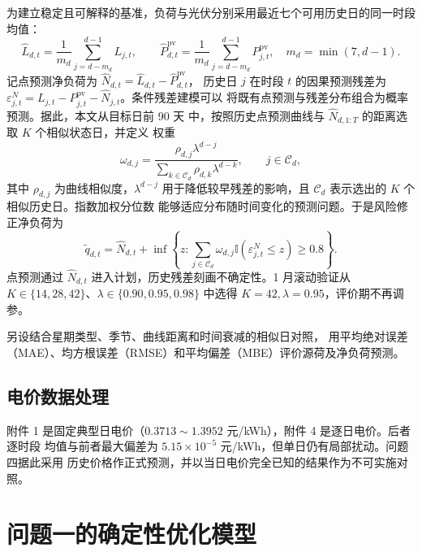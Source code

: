 \documentclass[withoutpreface,bwprint]{cumcmthesis}
\begin{document}
为建立稳定且可解释的基准，负荷与光伏分别采用最近七个可用历史日的同一时段均值：
\begin{equation}
  \widehat L_{d,t}=\frac{1}{m_d}\sum_{j=d-m_d}^{d-1}L_{j,t},\qquad
  \widehat P^{\mathrm{pv}}_{d,t}=\frac{1}{m_d}\sum_{j=d-m_d}^{d-1}P^{\mathrm{pv}}_{j,t},
  \quad m_d=\min(7,d-1).
  \label{eq:q2-seven-day}
\end{equation}
记点预测净负荷为 $\widehat N_{d,t}=\widehat L_{d,t}-\widehat P^{\mathrm{pv}}_{d,t}$，
历史日 $j$ 在时段 $t$ 的因果预测残差为
$\varepsilon^N_{j,t}=L_{j,t}-P^{\mathrm{pv}}_{j,t}-\widehat N_{j,t}$。条件残差建模可以
将既有点预测与残差分布组合为概率预测\cite{wang2018}。据此，本文从目标日前 90 天
中，按照历史点预测曲线与 $\widehat N_{d,1:T}$ 的距离选取 $K$ 个相似状态日，并定义
权重
\begin{equation}
  \omega_{d,j}=\frac{\rho_{d,j}\lambda^{d-j}}
  {\sum_{k\in\mathcal C_d}\rho_{d,k}\lambda^{d-k}},
  \qquad j\in\mathcal C_d,
  \label{eq:q2-residual-weight}
\end{equation}
其中 $\rho_{d,j}$ 为曲线相似度，$\lambda^{d-j}$ 用于降低较早残差的影响，且
$\mathcal C_d$ 表示选出的 $K$ 个相似历史日。指数加权分位数
能够适应分布随时间变化的预测问题\cite{taylor2007}。于是风险修正净负荷为
\begin{equation}
  \widetilde q_{d,t}=\widehat N_{d,t}
  +\inf\left\{z:\sum_{j\in\mathcal C_d}\omega_{d,j}
  \mathbb I(\varepsilon^N_{j,t}\leq z)\geq 0.8\right\}.
  \label{eq:q2-conditional-quantile}
\end{equation}
点预测通过 $\widehat N_{d,t}$ 进入计划，历史残差刻画不确定性。1 月滚动验证从
$K\in\{14,28,42\}$、$\lambda\in\{0.90,0.95,0.98\}$ 中选得 $K=42,\lambda=0.95$，评价期不再调参。

另设结合星期类型、季节、曲线距离和时间衰减的相似日对照\cite{mandal2006,acharya2020}，
用平均绝对误差（MAE）、均方根误差（RMSE）和平均偏差（MBE）评价源荷及净负荷预测。

\subsection{电价数据处理}

附件 1 是固定典型日电价（$0.3713\sim1.3952$ 元/kWh），附件 4 是逐日电价。后者逐时段
均值与前者最大偏差为 $5.15\times10^{-5}$ 元/kWh，但单日仍有局部扰动。问题四据此采用
历史价格作正式预测，并以当日电价完全已知的结果作为不可实施对照。

\section{问题一的确定性优化模型}
\end{document}
